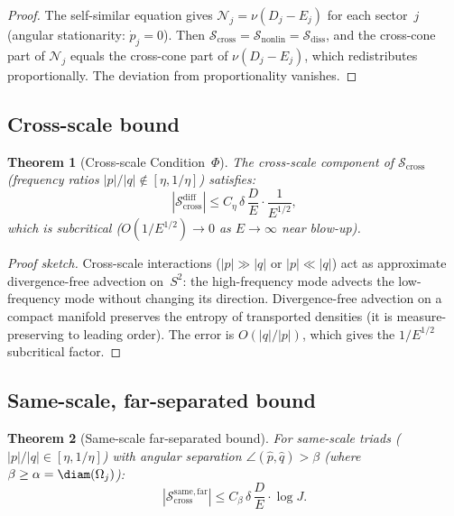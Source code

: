 \documentclass[11pt]{article}
\newtheorem{theorem}{Theorem}[section]
\theoremstyle{definition}
\newcommand{\cS}{\mathcal{S}}
\newcommand{\cN}{\mathcal{N}}
\begin{document}
\begin{proof}
The self-similar equation gives $\cN_j = \nu(D_j - E_j)$
for each sector~$j$ (angular stationarity: $\dot{p}_j = 0$).
Then
$\cS_{\mathrm{cross}} = \cS_{\mathrm{nonlin}}
= \cS_{\mathrm{diss}}$, and the cross-cone part of
$\cN_j$ equals the cross-cone part of $\nu(D_j - E_j)$,
which redistributes proportionally.  The deviation from
proportionality vanishes.
\end{proof}


\subsection{Cross-scale bound}

\begin{theorem}[Cross-scale Condition~$\Phi$]
\label{thm:cross-scale}
The cross-scale component of $\cS_{\mathrm{cross}}$
(frequency ratios $|p|/|q| \notin [\eta, 1/\eta]$)
satisfies:
\begin{equation}
|\cS_{\mathrm{cross}}^{\mathrm{diff}}|
\leq C_\eta\,\delta\,\frac{D}{E}\cdot\frac{1}{E^{1/2}},
\end{equation}
which is subcritical ($O(1/E^{1/2}) \to 0$ as
$E \to \infty$ near blow-up).
\end{theorem}

\begin{proof}[Proof sketch]
Cross-scale interactions ($|p| \gg |q|$ or $|p| \ll |q|$)
act as approximate divergence-free advection on~$S^2$:
the high-frequency mode advects the low-frequency mode
without changing its direction.  Divergence-free advection
on a compact manifold preserves the entropy of transported
densities (it is measure-preserving to leading order).
The error is $O(|q|/|p|)$, which gives the $1/E^{1/2}$
subcritical factor.
\end{proof}


\subsection{Same-scale, far-separated bound}

\begin{theorem}[Same-scale far-separated bound]
\label{thm:same-far}
For same-scale triads ($|p|/|q|\in[\eta,1/\eta]$) with
angular separation $\angle(\hat{p},\hat{q}) > \beta$
(where $\beta \geq \alpha = \diam(\Omega_j)$):
\begin{equation}
|\cS_{\mathrm{cross}}^{\mathrm{same,far}}|
\leq C_\beta\,\delta\,\frac{D}{E}\cdot
\log J.
\end{equation}
\end{theorem}
\end{document}
